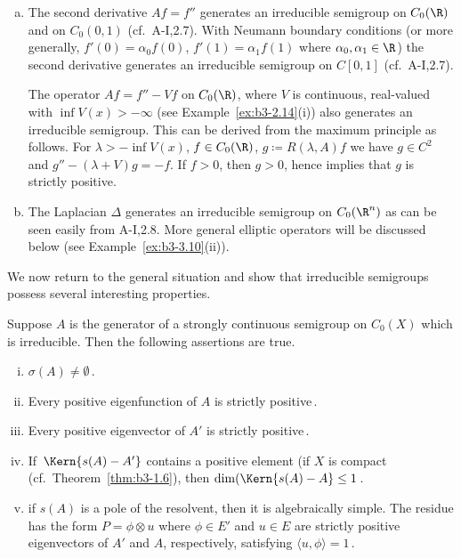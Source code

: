 \begin{examples}
\begin{enumerate}[(a), wide]
	\item 
	The second derivative $Af = f''$ generates an irreducible semigroup on $C_{0}(\R)$ and on $C_{0}(0,1)$ (cf.\ A-I,2.7).
	With Neumann boundary conditions (or more generally, $f'(0) = \alpha_{0}f(0)$, $f'(1) = \alpha_{1}f(1)$ where $\alpha_{0}, \alpha_{1} \in \R$) the second derivative generates an irreducible semigroup on $C[0,1]$ (cf.\ A-I,2.7).
	
	The operator $Af = f'' - Vf$ on $C_{0}(\R)$, where $V$ is continuous, real-valued with $\inf V(x) > -\infty$ (see Example~\ref{ex:b3-2.14}(i)) also generates an irreducible semigroup.
	This can be derived from the maximum principle as follows. For $\lambda > -\inf V(x)$, $f \in C_{0}(\R)$, $g \coloneq R(\lambda,A)f$ we have $g \in C^2$ and $g'' - (\lambda + V)g = -f$.
	If $f > 0$, then $g > 0$, hence \citet[Chap.I, Theorem~3]{protterweinberger:1967} implies that $g$ is strictly positive.
	
	\item 
	The Laplacian $\Delta$ generates an irreducible semigroup on $C_{0}(\R^n)$ as can be seen easily from A-I,2.8.
	More general elliptic operators will be discussed below (see Example~\ref{ex:b3-3.10}(ii)).
\end{enumerate}
\end{examples}
We now return to the general situation and show that irreducible semigroups possess several interesting properties.
\begin{proposition}\label{prop:b3-3.5}
	Suppose $A$ is the generator of a strongly continuous semigroup on $C_{0}(X)$ which is irreducible.
	Then the following assertions are true.
	\begin{enumerate}[(i)]
		\item 
		$\sigma(A) \neq \emptyset$\,.
		
		\item 
		Every positive eigenfunction of $A$ is strictly positive\,.
		
		\item 
		Every positive eigenvector of $A'$ is strictly positive\,.
		
		\item 
		If\ $\Kern{s(A) - A'}$ contains a positive element (\eg if $X$ is compact (cf.\ Theorem~\ref{thm:b3-1.6}), then $\dim(\Kern{s(A) - A} \leq 1$\,.
		
		\item 
		if $s(A)$ is a pole of the resolvent, then it is algebraically simple.
		The residue has the form $P = \phi \otimes u$ where $\phi \in E'$ and $u \in E$ are strictly positive eigenvectors of $A'$ and $A$, respectively, satisfying $\langle u,\phi\rangle = 1$\,.
	\end{enumerate}
\end{proposition}

